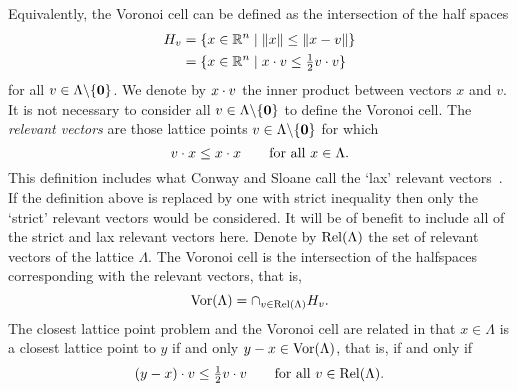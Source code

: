 \documentclass[final,leqno]{siamltex}
\begin{document}
Equivalently, the Voronoi cell can be defined as the intersection of the half spaces 
\begin{align*}
H_{v} &= \{x \in {\mathbb R}^n \mid \|x\| \leq \|x - v\| \} \\
&= \{x \in {\mathbb R}^n \mid x \cdot v \leq \tfrac{1}{2}v \cdot v \}
\end{align*}
for all $v \in \Lambda \backslash  \{\boldsymbol{0}\}$.  %
We denote by $x \cdot v$ the inner product between vectors $x$ and $v$.
It is not necessary to consider all $v \in \Lambda \backslash  \{\boldsymbol{0}\}$ to define the Voronoi cell.   %
The \emph{relevant vectors} are those lattice points $v \in \Lambda \backslash  \{\boldsymbol{0}\}$ for which  
\[
v \cdot x \leq x \cdot x \qquad \text{for all $x \in \Lambda$}.
\]
This definition includes what Conway and Sloane call the `lax' relevant vectors~\cite{ConwaySloane1992_voronoi_lattice_3d_obtuse_superbases}.  If the definition above is replaced by one with strict inequality then only the `strict' relevant vectors would be considered. It will be of benefit to include all of the strict and lax relevant vectors here.  Denote by $\operatorname{Rel}(\Lambda)$ the set of relevant vectors of the lattice $\Lambda$.  The Voronoi cell is the intersection of the halfspaces corresponding with the relevant vectors, that is, 
\[
\operatorname{Vor}(\Lambda) = \cap_{v\in\operatorname{Rel}(\Lambda)}{H_{v}}.
\]
The closest lattice point problem and the Voronoi cell are related in that $x\in\Lambda$ is a closest lattice point to $y$ if and only $y - x \in \operatorname{Vor}(\Lambda)$, that is, if and only if
\begin{equation}\label{eq:relvectnearpointieq}
\dotprod{(y - x)}{v} \leq \tfrac{1}{2} \dotprod{v}{v} \qquad \text{for all $v \in \relevant(\Lambda)$}.  
\end{equation} 

\end{document}
